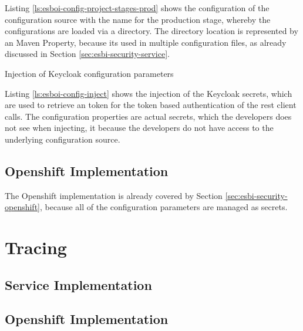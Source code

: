 Listing \vref{ls:esboi-config-project-stages-prod} shows the configuration of the configuration source with the name  for the production stage, whereby the configurations are loaded via a directory. The directory location is represented by an Maven Property, because its used in multiple configuration files, as already discussed in Section \vref{sec:esbi-security-service}.


\begin{listing}
	\caption{Injection of Keycloak configuration parameters}
	\label{ls:esboi-config-inject}
\end{listing}

Listing \vref{ls:esboi-config-inject} shows the injection of the Keycloak secrets, which are used to retrieve an token for the token based authentication of the rest client calls. The configuration properties are actual secrets, which the developers does not see when injecting, it because the developers do not have access to the underlying configuration source.

\subsection{Openshift Implementation}
\label{sec:esbi-config-openshift}
The Openshift implementation is already covered by Section \vref{sec:esbi-security-openshift}, because all of the configuration parameters are managed as secrets. 










\section{Tracing}
\label{sec:esbi-tracing}

\subsection{Service Implementation}
\label{sec:esbi-tracing-service}

\subsection{Openshift Implementation}
\label{sec:esbi-tracing-openshift}

